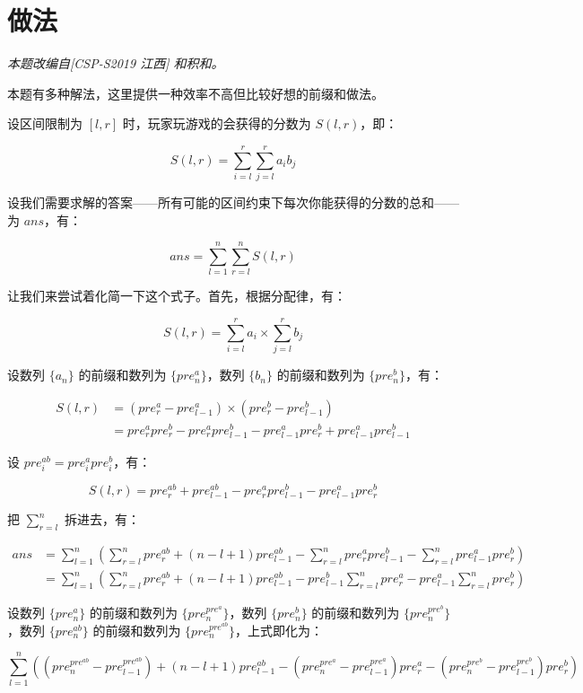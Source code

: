 \documentclass{ctsol}
\begin{document}
\makesolution
\section*{做法}
\emph{本题改编自[CSP-S2019 江西] 和积和。}

本题有多种解法，这里提供一种效率不高但比较好想的前缀和做法。

设区间限制为 $[l,r]$ 时，玩家玩游戏的会获得的分数为 $S(l,r)$，即：

$$S(l,r) = \sum_{i=l}^r \sum_{j=l}^r a_i b_j$$

设我们需要求解的答案——所有可能的区间约束下每次你能获得的分数的总和——为 $ans$，有：

$$ans = \sum_{l=1}^n \sum_{r=l}^n S(l,r)$$

让我们来尝试着化简一下这个式子。首先，根据分配律，有：

$$S(l,r) = \sum_{i=l}^ra_i \times \sum_{j=l}^rb_j$$

设数列 $\{a_n\}$ 的前缀和数列为 $\{pre^a_n\}$，数列 $\{b_n\}$ 的前缀和数列为 $\{pre^b_n\}$，有：

\begin{align*}
    S(l,r) & = \left(pre^a_r - pre^a_{l-1}\right) \times \left(pre^b_r - pre^b_{l-1}\right)      \\
           & = pre^a_rpre^b_r - pre^a_rpre^b_{l-1} - pre^a_{l-1}pre^b_r + pre^a_{l-1}pre^b_{l-1}
\end{align*}

设 $pre^{ab}_i = pre^a_ipre^b_i$，有：

$$S(l,r) = pre^{ab}_r + pre^{ab}_{l-1} - pre^a_rpre^b_{l-1} - pre^a_{l-1}pre^b_r$$

把 $\sum_{r=l}^n$ 拆进去，有：

\begin{align*}
    ans & = \sum_{l=1}^n \left(
    \sum_{r=l}^n pre^{ab}_r +
    (n-l+1)pre^{ab}_{l-1} -
    \sum_{r=l}^n pre^a_rpre^b_{l-1} -
    \sum_{r=l}^n pre^a_{l-1}pre^b_r\right
    )                           \\
        & = \sum_{l=1}^n \left(
    \sum_{r=l}^n pre^{ab}_r +
    (n-l+1)pre^{ab}_{l-1} -
    pre^b_{l-1}\sum_{r=l}^n pre^a_r -
    pre^a_{l-1}\sum_{r=l}^n pre^b_r\right
    )
\end{align*}

设数列 $\{pre^a_n\}$ 的前缀和数列为 $\{pre^{pre^a}_n\}$，数列 $\{pre^b_n\}$ 的前缀和数列为 $\{pre^{pre^b}_n\}$，数列 $\{pre^{ab}_n\}$ 的前缀和数列为 $\{pre^{pre^{ab}}_n\}$，上式即化为：

\small
$$
    \sum_{l=1}^n \left(
    \left(pre^{pre^{ab}}_n - pre^{pre^{ab}}_{l-1}\right) +
    (n-l+1)pre^{ab}_{l-1} -
    \left(pre^{pre^a}_n - pre^{pre^a}_{l-1}\right)pre^a_r -
    \left(pre^{pre^b}_n - pre^{pre^b}_{l-1}\right)pre^b_r
    \right)
$$
\normalsize
\end{document}
